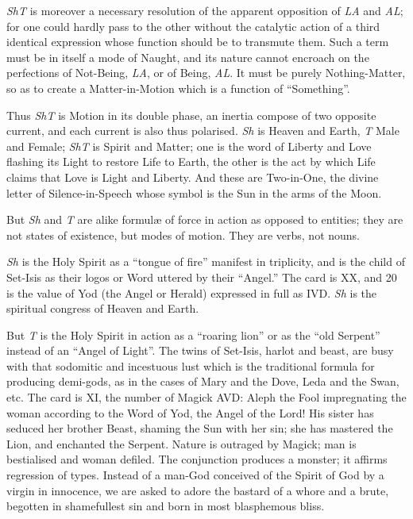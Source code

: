 \textit{ShT} is moreover a necessary resolution of the apparent opposition of \textit{LA} and \textit{AL}; for one could hardly pass to the other without the catalytic action of a third identical expression whose function should be to transmute them. Such a term must be in itself a mode of Naught, and its nature cannot encroach on the perfections of Not-Being, \textit{LA}, or of Being, \textit{AL}. It must be purely Nothing-Matter, so as to create a Matter-in-Motion which is a function of \enquote{Something}.

Thus \textit{ShT} is Motion in its double phase, an inertia compose of two opposite current, and each current is also thus polarised. \textit{Sh} is Heaven and Earth, \textit{T} Male and Female; \textit{ShT} is Spirit and Matter; one is the word of Liberty and Love flashing its Light to restore Life to Earth, the other is the act by which Life claims that Love is Light and Liberty. And these are Two-in-One, the divine letter of Silence-in-Speech whose symbol is the Sun in the arms of the Moon.

But \textit{Sh} and \textit{T} are alike formul\ae{} of force in action as opposed to entities; they are not states of existence, but modes of motion. They are verbs, not nouns.

\textit{Sh} is the Holy Spirit as a \enquote{tongue of fire} manifest in triplicity, and is the child of Set-Isis as their logos or Word uttered by their \enquote{Angel.} The card is XX, and 20 is the value of Yod (the Angel or Herald) expressed in full as IVD. \textit{Sh} is the spiritual congress of Heaven and Earth.

But \textit{T} is the Holy Spirit in action as a \enquote{roaring lion} or as the \enquote{old Serpent} instead of an \enquote{Angel of Light}. The twins of Set-Isis, harlot and beast, are busy with that sodomitic and incestuous lust which is the traditional formula for producing demi-gods, as in the cases of Mary and the Dove, Leda and the Swan, etc. The card is XI, the number of Magick AVD: Aleph the Fool impregnating the woman according to the Word of Yod, the Angel of the Lord! His sister has seduced her brother Beast, shaming the Sun with her sin; she has mastered the Lion, and enchanted the Serpent. Nature is outraged by Magick; man is bestialised and woman defiled. The conjunction produces a monster; it affirms regression of types. Instead of a man-God conceived of the Spirit of God by a virgin in innocence, we are asked to adore the bastard of a whore and a brute, begotten in shamefullest sin and born in most blasphemous bliss.

